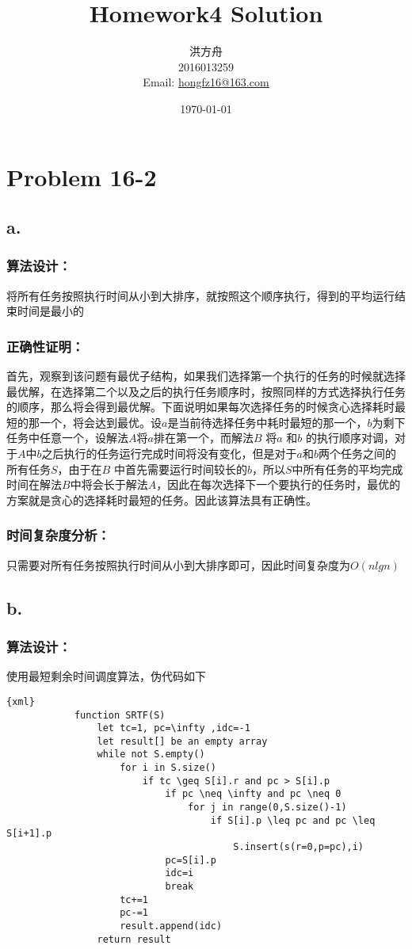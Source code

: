 ﻿\documentclass{article}
\title{Homework4 Solution}
\author{洪方舟\\2016013259\\Email: \href{mailto:hongfz16@163.com}{hongfz16@163.com}}
\date{\today}
\begin{document}
  \maketitle
  \section*{Problem 16-2}
    \subsection*{a.}
        \subsubsection*{算法设计：}
            将所有任务按照执行时间从小到大排序，就按照这个顺序执行，得到的平均运行结束时间是最小的
        \subsubsection*{正确性证明：}
            首先，观察到该问题有最优子结构，如果我们选择第一个执行的任务的时候就选择最优解，在选择第二个以及之后的执行任务顺序时，按照同样的方式选择执行任务的顺序，那么将会得到最优解。下面说明如果每次选择任务的时候贪心选择耗时最短的那一个，将会达到最优。设$a$是当前待选择任务中耗时最短的那一个，$b$为剩下任务中任意一个，设解法$A$将$a$排在第一个，而解法$B$ 将$a$ 和$b$ 的执行顺序对调，对于$A$中$b$之后执行的任务运行完成时间将没有变化，但是对于$a$和$b$两个任务之间的所有任务$S$，由于在$B$ 中首先需要运行时间较长的$b$，所以$S$中所有任务的平均完成时间在解法$B$中将会长于解法$A$，因此在每次选择下一个要执行的任务时，最优的方案就是贪心的选择耗时最短的任务。因此该算法具有正确性。
        \subsubsection*{时间复杂度分析：}
            只需要对所有任务按照执行时间从小到大排序即可，因此时间复杂度为$O(nlgn)$
    \subsection*{b.}
        \subsubsection*{算法设计：}
            使用最短剩余时间调度算法，伪代码如下
            \begin{lstlisting}{xml}
            function SRTF(S)
                let tc=1, pc=\infty ,idc=-1
                let result[] be an empty array
                while not S.empty()
                    for i in S.size()
                        if tc \geq S[i].r and pc > S[i].p
                            if pc \neq \infty and pc \neq 0
                                for j in range(0,S.size()-1)
                                    if S[i].p \leq pc and pc \leq S[i+1].p
                                        S.insert(s(r=0,p=pc),i)
                            pc=S[i].p
                            idc=i
                            break
                    tc+=1
                    pc-=1
                    result.append(idc)
                return result
            \end{lstlisting}
\end{document}
